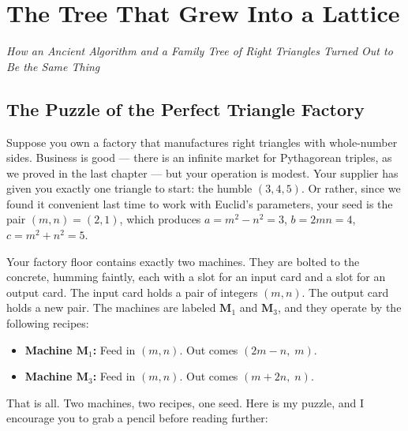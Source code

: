 \documentclass[11pt,openright,twoside]{book}
\theoremstyle{definition}
\begin{document}
\clearpage


\chapter{The Tree That Grew Into a Lattice}
\label{ch:2}

\begin{center}
\textit{How an Ancient Algorithm and a Family Tree of Right Triangles Turned Out to Be the Same Thing}
\end{center}
\bigskip




\bigskip


\section{The Puzzle of the Perfect Triangle Factory}

Suppose you own a factory that manufactures right triangles with whole-number sides. Business is good --- there is an infinite market for Pythagorean triples, as we proved in the last chapter --- but your operation is modest. Your supplier has given you exactly one triangle to start: the humble $(3, 4, 5)$. Or rather, since we found it convenient last time to work with Euclid's parameters, your seed is the pair $(m, n) = (2, 1)$, which produces $a = m^2 - n^2 = 3$, $b = 2mn = 4$, $c = m^2 + n^2 = 5$.

Your factory floor contains exactly two machines. They are bolted to the concrete, humming faintly, each with a slot for an input card and a slot for an output card. The input card holds a pair of integers $(m, n)$. The output card holds a new pair. The machines are labeled $\mathbf{M}_1$ and $\mathbf{M}_3$, and they operate by the following recipes:

\begin{itemize}[leftmargin=*]
\item \textbf{Machine $\mathbf{M}_1$:} Feed in $(m, n)$. Out comes $(2m - n,\; m)$.
\item \textbf{Machine $\mathbf{M}_3$:} Feed in $(m, n)$. Out comes $(m + 2n,\; n)$.
\end{itemize}

That is all. Two machines, two recipes, one seed. Here is my puzzle, and I encourage you to grab a pencil before reading further:
\end{document}
